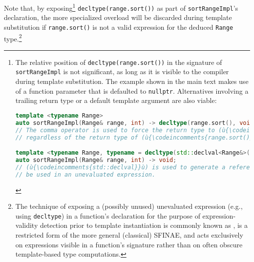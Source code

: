 \noindent Note that, by exposing{\cprotect\footnote{The relative position of
\lstinline!decltype(range.sort())! in the signature of
\lstinline!sortRangeImpl! is not significant, as long as it is visible to
the compiler
during template substitution. The example shown in the main text makes use of a function parameter that is defaulted to
\lstinline!nullptr!. Alternatives involving a trailing return type or a
default template argument are also viable:

%
\begin{lstlisting}[language=C++, basicstyle={\ttfamily\footnotesize}]
template <typename Range>
auto sortRangeImpl(Range& range, int) -> decltype(range.sort(), void());
// The comma operator is used to force the return type to (ù{\codeincomments{void}}ù),
// regardless of the return type of (ù{\codeincomments{range.sort()}}ù).

template <typename Range, typename = decltype(std::declval<Range&>().sort())>
auto sortRangeImpl(Range& range, int) -> void;
// (ù{\codeincomments{std::declval}}ù) is used to generate a reference to (ù{\codeincomments{Range}}ù) that can
// be used in an unevaluated expression.
\end{lstlisting}
}} \lstinline!decltype(range.sort())! as part of
\lstinline!sortRangeImpl!'s declaration, the more specialized overload will
be discarded during template substitution if \lstinline!range.sort()! is
not a valid expression for the deduced \lstinline!Range!
type.{\cprotect\footnote{The technique of exposing a (possibly unused)
unevaluated expression (e.g., using \lstinline!decltype!) in a function's
declaration for the purpose of expression-validity detection prior to
template instantiation is commonly known as ,
is a restricted form of the more general (classical) SFINAE, and acts exclusively on
expressions visible in a function's signature rather than on often obscure
template-based type computations.}}

